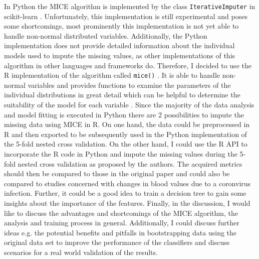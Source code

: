 \documentclass[12pt,a4paper,oneside]{article}
\newcommand{\code}{\texttt}
\begin{document}
In Python the MICE algorithm is implemented by the class \code{IterativeImputer} in scikit-learn \cite{scikit-learn}. Unfortunately, this implementation is still experimental and poses some shortcomings, most prominently this implementation is not yet able to handle non-normal distributed variables. Additionally, the Python implementation does not provide detailed information about the individual models used to impute the missing values, as other implementations of this algorithm in other languages and frameworks do. Therefore, I decided to use the R implementation of the algorithm called \code{mice()} \cite{RN135}. It is able to handle non-normal variables and provides functions to examine the parameters of the individual distributions in great detail which can be helpful to determine the suitability of the model for each variable \cite{RN142}. Since the majority of the data analysis and model fitting is executed in Python there are 2 possibilities to impute the missing data using MICE in R. On one hand, the data could be preprocessed in R and then exported to be subsequently used in the Python implementation of the 5-fold nested cross validation. 
On the other hand, I could use the R API to incorporate the R code in Python and impute the missing values during the 5-fold nested cross validation as proposed by the authors.
The acquired metrics should then be compared to those in the original paper and could also be compared to studies concerned with changes in blood values due to a coronvirus infection. Further, it could be a good idea to train a decision tree to gain some insights about the importance of the features. Finally, in the discussion, I would like to discuss the advantages and shortcomings of the MICE algorithm, the analysis and training process in general. Additionally, I could discuss further ideas e.g. the potential benefits and pitfalls in bootstrapping data using the original data set to improve the performance of the classifiers and discuss scenarios for a real world validation of the results.
\printbibliography
\end{document}
